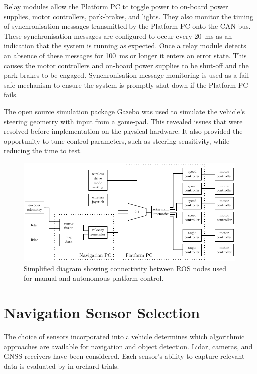 \documentclass[preprint,authoryear,12pt]{elsarticle}
\begin{document}
        Relay modules allow the Platform PC to toggle power to on-board power supplies, motor controllers, park-brakes, and lights.
        They also monitor the timing of synchronisation messages transmitted by the Platform PC onto the CAN bus.
        These synchronisation messages are configured to occur every \SI{20}{\milli\second} as an indication that the system is running as expected.
        Once a relay module detects an absence of these messages for \SI{100}{\milli\second} or longer it enters an error state.
        This causes the motor controllers and on-board power supplies to be shut-off and the park-brakes to be engaged.
        Synchronisation message monitoring is used as a fail-safe mechanism to ensure the system is promptly shut-down if the Platform PC fails.

        The open source simulation package Gazebo was used to simulate the vehicle's steering geometry with input from a game-pad.
        This revealed issues that were resolved before implementation on the physical hardware.
        It also provided the opportunity to tune control parameters, such as steering sensitivity, while reducing the time to test.

        \begin{figure}[htb]
            \centering
            \includegraphics[width=\linewidth]{imgs/system_diagram/software_v2.pdf}
            \caption{Simplified diagram showing connectivity between ROS nodes used for manual and autonomous platform control.}
            \label{fig:system_diagram_software}
        \end{figure}


\section{Navigation Sensor Selection}
\label{sect:sensors}
    The choice of sensors incorporated into a vehicle determines which algorithmic approaches are available for navigation and object detection.
    Lidar, cameras, and GNSS receivers have been considered.
    Each sensor's ability to capture relevant data is evaluated by in-orchard trials.
\end{document}
